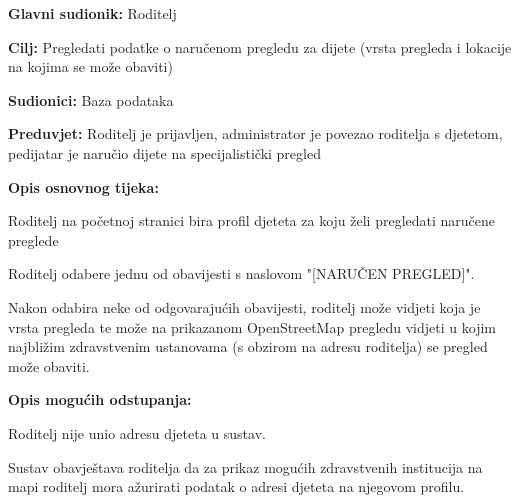 					\noindent {}
					\begin{packed_item}
						
						\item \textbf{Glavni sudionik: }Roditelj
						\item  \textbf{Cilj:} Pregledati podatke o naručenom pregledu za dijete (vrsta pregleda i lokacije na kojima se može obaviti)
						\item  \textbf{Sudionici:} Baza podataka
						\item  \textbf{Preduvjet:} Roditelj je prijavljen, administrator je povezao roditelja s djetetom, pedijatar je naručio dijete na specijalistički pregled
						\item  \textbf{Opis osnovnog tijeka:}
						
						\item[] \begin{packed_enum}
							
							\item Roditelj na početnoj stranici bira profil djeteta za koju želi pregledati naručene preglede 
							\item Roditelj odabere jednu od obavijesti s naslovom "[NARUČEN PREGLED]".
							\item Nakon odabira neke od odgovarajućih obavijesti, roditelj može vidjeti koja je vrsta pregleda te može na prikazanom OpenStreetMap pregledu vidjeti u kojim najbližim zdravstvenim ustanovama (s obzirom na adresu roditelja) se pregled može obaviti.
						\end{packed_enum}
						
						\item  \textbf{Opis mogućih odstupanja:}
						
						\item[] \begin{packed_item}
							
							\item[3.a] Roditelj nije unio adresu djeteta u sustav.
							\item[] \begin{packed_enum}
								
								\item Sustav obavještava roditelja da za prikaz mogućih zdravstvenih institucija na mapi roditelj mora ažurirati podatak o adresi djeteta na njegovom profilu.
							\end{packed_enum}
							
							
						\end{packed_item}
					\end{packed_item}
					
